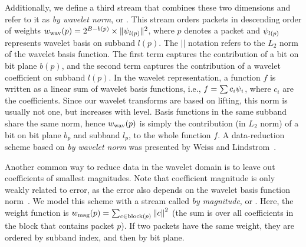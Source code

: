 Additionally, we define a third stream that combines these two dimensions and refer to it as
\emph{by wavelet norm}, or \swav. This stream orders packets in descending order of weights
$\wwav(p)=2^{B-b(p)}\times \| \wbas_{l(p)} \|^2$, 
where $p$ denotes a packet and $\wbas_{l(p)}$
represents wavelet basis on subband $l(p)$. The $||$ notation refers to the $L_2$ norm of the
wavelet basis function. The first term captures the contribution of a bit on bit plane $b(p)$, and
the second term captures the contribution of a wavelet coefficient on subband $l(p)$.
%
%
In the wavelet representation, a function $f$ is written as a linear sum of wavelet basis functions, 
i.e., $f=\sum{c_i\wbas_i}$, where $c_i$ are the coefficients. Since our wavelet transforms
are based on lifting, this norm is usually not one, but increases with level. Basis functions in the
same subband share the same norm, hence $\wwav(p)$ is simply the contribution (in $L_2$ norm) of a
bit on bit plane $b_p$ and subband $l_p$, to the whole function $f$. A data-reduction scheme based
on \emph{by wavelet norm} was presented by Weiss and Lindstrom~\cite{weiss}.

Another common way to reduce data in the wavelet domain is to leave out coefficients of smallest
magnitudes. Note that coefficient magnitude is only weakly related to error, as the error also
depends on the wavelet basis function norm~\cite{weiss}. We model this scheme with a stream called
\emph{by magnitude}, or \smag. Here, the weight function is $\wmag(p)=\sum_{c\in
\text{block}(p)}\norm{c}^2$ (the sum is over all coefficients in the block that contains packet
$p$). If two packets have the same weight, they are ordered by subband index, and then by bit plane.

